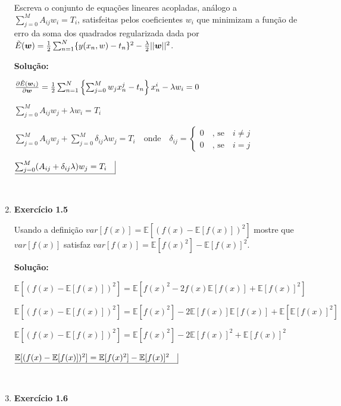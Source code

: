 \begin{enumerate}
Escreva o conjunto de equações lineares acopladas, análogo a $\sum_{j=0}^{M}A_{ij} w_i = T_i$, satisfeitas pelos coeficientes $w_i$ que minimizam a função de erro da soma dos quadrados regularizada dada por $\Tilde{E}(\boldsymbol{w})=\frac{1}{2}\sum_{n=1}^{N} \{y(x_n,w)-t_n\}^2 - \frac{\lambda}{2}||\boldsymbol{w}||^2$.
\newline \par
\textbf{Solução:}


$ \frac{\partial \Tilde{E}(\boldsymbol{w}_i)}{\partial \boldsymbol{w}}=\frac{1}{2}\sum_{n=1}^{N} \left\{ \sum_{j=0}^{M} w_j x_n^j -t_n 
\right\} x_n^i    - \lambda w_i = 0$

$  \sum_{j=0}^{M}A_{ij} w_j + \lambda w_i = T_i $

$  \sum_{j=0}^{M}A_{ij} w_j + \sum_{j=0}^{M} \delta_{ij} \lambda w_j = T_i \quad \text{onde} \quad  \delta_{ij} = \begin{cases}
0 \quad \text{, se} \quad i \neq j \\
0 \quad \text{, se} \quad i = j
\end{cases}$

$\underline{\sum_{j=0}^{M}(A_{ij} + \delta_{ij} \lambda)w_j = T_i\quad} \vline $

$ $

\item \textbf{Exercício 1.5} \par

Usando a definição $var[f(x)]=\mathbb{E}[(f(x)-\mathbb{E}[f(x)])^2]$ mostre que $var[f(x)]$ satisfaz $var[f(x)]=\mathbb{E}[f(x)^2]-\mathbb{E}[f(x)]^2$.
\newline \par
\textbf{Solução:}


$\mathbb{E}[(f(x)-\mathbb{E}[f(x)])^2] = \mathbb{E}[f(x)^2-2f(x)\mathbb{E}[f(x)]+\mathbb{E}[f(x)]^2]$

$\mathbb{E}[(f(x)-\mathbb{E}[f(x)])^2] = \mathbb{E}[f(x)^2]-2\mathbb{E}[f(x)]\mathbb{E}[f(x)]+\mathbb{E}[\mathbb{E}[f(x)]^2]$

$\mathbb{E}[(f(x)-\mathbb{E}[f(x)])^2] = \mathbb{E}[f(x)^2]-2\mathbb{E}[f(x)]^2+\mathbb{E}[f(x)]^2$

$\underline{\mathbb{E}[(f(x)-\mathbb{E}[f(x)])^2] = \mathbb{E}[f(x)^2]-\mathbb{E}[f(x)]^2\quad} \vline$

$ $



\item \textbf{Exercício 1.6} \par


\end{enumerate}
